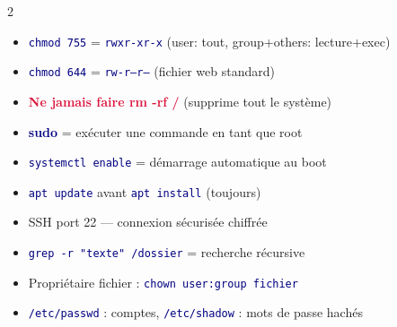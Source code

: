 \documentclass[a4paper,10pt]{article}
\newcommand{\key}[1]{\textbf{\textcolor{navy}{#1}}}
\newcommand{\warn}[1]{\textbf{\textcolor{crimson}{#1}}}
\newcommand{\cmd}[1]{\texttt{\textcolor{navy}{#1}}}
\begin{document}
\vspace{4pt}
\begin{tcolorbox}[basebox, colframe=crimson, title=Points clés à retenir pour l'examen]
\begin{multicols}{2}
\begin{itemize}
  \item \cmd{chmod 755} = \cmd{rwxr-xr-x} (user: tout, group+others: lecture+exec)
  \item \cmd{chmod 644} = \cmd{rw-r--r--} (fichier web standard)
  \item \warn{Ne jamais faire rm -rf /} (supprime tout le système)
  \item \key{sudo} = exécuter une commande en tant que root
  \item \cmd{systemctl enable} = démarrage automatique au boot
  \item \cmd{apt update} avant \cmd{apt install} (toujours)
  \item SSH port 22 — connexion sécurisée chiffrée
  \item \cmd{grep -r "texte" /dossier} = recherche récursive
  \item Propriétaire fichier : \cmd{chown user:group fichier}
  \item \cmd{/etc/passwd} : comptes, \cmd{/etc/shadow} : mots de passe hachés
\end{itemize}
\end{multicols}
\end{tcolorbox}
\end{document}
